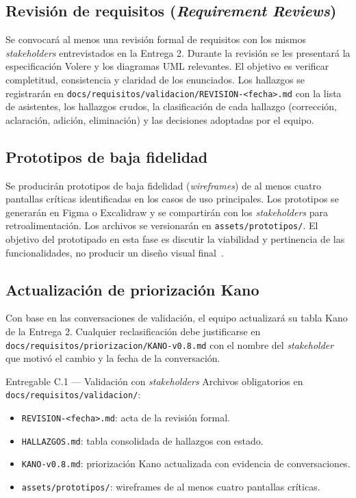 \documentclass[11pt,a4paper]{article}
\begin{document}
\subsection{Revisi\'on de requisitos (\emph{Requirement Reviews})}

Se convocar\'a al menos una revisi\'on formal de requisitos con los mismos \emph{stakeholders} entrevistados en la Entrega 2. Durante la revisi\'on se les presentar\'a la especificaci\'on Volere y los diagramas UML relevantes. El objetivo es verificar completitud, consistencia y claridad de los enunciados. Los hallazgos se registrar\'an en \texttt{docs/requisitos/validacion/REVISION-<fecha>.md} con la lista de asistentes, los hallazgos crudos, la clasificaci\'on de cada hallazgo (correcci\'on, aclaraci\'on, adici\'on, eliminaci\'on) y las decisiones adoptadas por el equipo.

\subsection{Prototipos de baja fidelidad}

Se producir\'an prototipos de baja fidelidad (\emph{wireframes}) de al menos cuatro pantallas cr\'iticas identificadas en los casos de uso principales. Los prototipos se generar\'an en Figma o Excalidraw y se compartir\'an con los \emph{stakeholders} para retroalimentaci\'on. Los archivos se versionar\'an en \texttt{assets/prototipos/}. El objetivo del prototipado en esta fase es discutir la viabilidad y pertinencia de las funcionalidades, no producir un dise\~no visual final~\cite{sommerville2011software,pohl2010requirements}.

\subsection{Actualizaci\'on de priorizaci\'on Kano}

Con base en las conversaciones de validaci\'on, el equipo actualizar\'a su tabla Kano de la Entrega 2. Cualquier reclasificaci\'on debe justificarse en \texttt{docs/requisitos/priorizacion/KANO-v0.8.md} con el nombre del \emph{stakeholder} que motiv\'o el cambio y la fecha de la conversaci\'on.

\begin{cajaentregable}{Entregable C.1 --- Validaci\'on con \emph{stakeholders}}
Archivos obligatorios en \texttt{docs/requisitos/validacion/}:
\begin{itemize}
    \item \texttt{REVISION-<fecha>.md}: acta de la revisi\'on formal.
    \item \texttt{HALLAZGOS.md}: tabla consolidada de hallazgos con estado.
    \item \texttt{KANO-v0.8.md}: priorizaci\'on Kano actualizada con evidencia de conversaciones.
    \item \texttt{assets/prototipos/}: wireframes de al menos cuatro pantallas cr\'iticas.
\end{itemize}
\end{cajaentregable}
\end{document}
